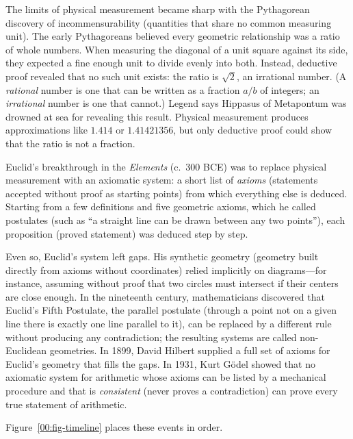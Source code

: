 \begin{historybox}
The limits of physical measurement became sharp with the Pythagorean discovery of incommensurability (quantities that share no common measuring unit). The early Pythagoreans believed every geometric relationship was a ratio of whole numbers. When measuring the diagonal of a unit square against its side, they expected a fine enough unit to divide evenly into both. Instead, deductive proof revealed that no such unit exists: the ratio is $\sqrt{2}$, an irrational number. (A \emph{rational} number is one that can be written as a fraction $a/b$ of integers; an \emph{irrational} number is one that cannot.) Legend says Hippasus of Metapontum was drowned at sea for revealing this result. Physical measurement produces approximations like $1.414$ or $1.41421356$, but only deductive proof could show that the ratio is not a fraction.

Euclid's breakthrough in the \emph{Elements} (c.~300 BCE) was to replace physical measurement with an axiomatic system: a short list of \emph{axioms} (statements accepted without proof as starting points) from which everything else is deduced. Starting from a few definitions and five geometric axioms, which he called postulates (such as ``a straight line can be drawn between any two points''), each proposition (proved statement) was deduced step by step.

Even so, Euclid's system left gaps. His synthetic geometry (geometry built directly from axioms without coordinates) relied implicitly on diagrams---for instance, assuming without proof that two circles must intersect if their centers are close enough. In the nineteenth century, mathematicians discovered that Euclid's Fifth Postulate, the parallel postulate (through a point not on a given line there is exactly one line parallel to it), can be replaced by a different rule without producing any contradiction; the resulting systems are called non-Euclidean geometries. In 1899, David Hilbert supplied a full set of axioms for Euclid's geometry that fills the gaps. In 1931, Kurt G\"odel showed that no axiomatic system for arithmetic whose axioms can be listed by a mechanical procedure and that is \emph{consistent} (never proves a contradiction) can prove every true statement of arithmetic.

Figure~\ref{00:fig-timeline} places these events in order.
\end{historybox}

